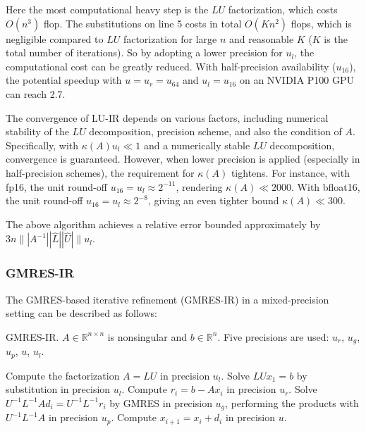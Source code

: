 \documentclass[12pt]{article}
\begin{document}
Here the most computational heavy step is the $LU$ factorization, which costs $O(n^3)$ flop. The substitutions on line 5 costs in total $O(Kn^2)$ flops, which is negligible compared to $LU$ factorization for large $n$ and reasonable $K$ ($K$ is the total number of iterations). So by adopting a lower precision for $u_l$, the computational cost can be greatly reduced. With half-precision availability ($u_{16}$), the potential speedup with $u=u_r=u_{64}$ and $u_l=u_{16}$ on an NVIDIA P100 GPU can reach 2.7. 

The convergence of LU-IR depends on various factors, including numerical stability of the $LU$ decomposition, precision scheme, and also the condition of $A$. Specifically, with $\kappa(A)u_l \ll 1$ and a numerically stable $LU$ decomposition, convergence is guaranteed. However, when lower precision is applied (especially in half-precision schemes), the requirement for $\kappa(A)$ tightens. For instance, with fp16, the unit round-off $u_{16}=u_l\approx 2^{-11}$, rendering $\kappa(A)\ll 2000$. With bfloat16, the unit round-off $u_{16}=u_l\approx 2^{-8}$, giving an even tighter bound $\kappa(A)\ll 300$.

The above algorithm achieves a relative error bounded approximately by $3n\||A^{-1}||\hat{L}||\hat{U}|\|u_l$.


\subsubsection{GMRES-IR}
The GMRES-based iterative refinement (GMRES-IR) in a mixed-precision setting can be described as follows:

\begin{algorithm}
    \caption{GMRES-IR. $A \in \mathbb{R}^{n \times n}$ is nonsingular and $b \in \mathbb{R}^n$. Five precisions are used: $u_r$, $u_g$, $u_p$, $u$, $u_l$.}
    \begin{algorithmic}[1]
        \State Compute the factorization $A = LU$ in precision $u_l$.
        \State Solve $LUx_1 = b$ by substitution in precision $u_l$.
            \State Compute $r_i = b - Ax_i$ in precision $u_r$.
            \State Solve $U^{-1}L^{-1}Ad_i = U^{-1}L^{-1}r_i$ by GMRES in precision $u_g$, performing the products with $U^{-1}L^{-1}A$ in precision $u_p$.
            \State Compute $x_{i+1} = x_i + d_i$ in precision $u$.
        \EndFor
    \end{algorithmic}
\end{algorithm}
\end{document}
